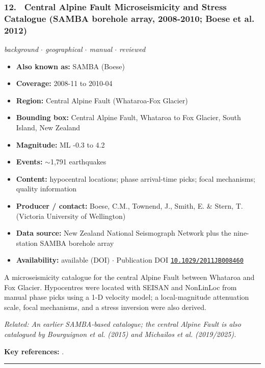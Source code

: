 \documentclass[10pt,a4paper]{article}
\newcommand{\catentryrule}{\par\vspace{3pt}\noindent\textcolor{rulegrey}{\rule{\linewidth}{0.3pt}}\par\vspace{5pt}}
\newcommand{\kv}[2]{\item \textbf{#1:} #2}
\begin{document}
\subsubsection*{\hypertarget{c:12}{12.}~ Central Alpine Fault Microseismicity and Stress Catalogue (SAMBA borehole array, 2008-2010; Boese et al. 2012)}
{\small\itshape background $\cdot$ geographical $\cdot$ manual $\cdot$ reviewed}\par\vspace{2pt}
\begin{itemize}[leftmargin=1.3em,itemsep=0.6pt,topsep=1pt,parsep=0pt]
\kv{Also known as}{SAMBA (Boese)}
\kv{Coverage}{2008-11 to 2010-04}
\kv{Region}{Central Alpine Fault (Whataroa-Fox Glacier)}
\kv{Bounding box}{Central Alpine Fault, Whataroa to Fox Glacier, South Island, New Zealand}
\kv{Magnitude}{ML -0.3 to 4.2}
\kv{Events}{$\sim$1,791 earthquakes}
\kv{Content}{hypocentral locations; phase arrival-time picks; focal mechanisms; quality information}
\kv{Producer / contact}{Boese, C.M., Townend, J., Smith, E. \& Stern, T. (Victoria University of Wellington)}
\kv{Data source}{New Zealand National Seismograph Network plus the nine-station SAMBA borehole array}
\kv{Availability}{available (DOI) $\cdot$ Publication DOI \href{https://doi.org/10.1029/2011JB008460}{\nolinkurl{10.1029/2011JB008460}}}
\end{itemize}
\par\vspace{2pt}A microseismicity catalogue for the central Alpine Fault between Whataroa and Fox Glacier. Hypocentres were located with SEISAN and NonLinLoc from manual phase picks using a 1-D velocity model; a local-magnitude attenuation scale, focal mechanisms, and a stress inversion were also derived.
\par{\small\itshape Related: An earlier SAMBA-based catalogue; the central Alpine Fault is also catalogued by Bourguignon et al. (2015) and Michailos et al. (2019/2025).}
\par\vspace{2pt}\textbf{Key references:} \cite{Boese2012}.
\catentryrule
\end{document}
